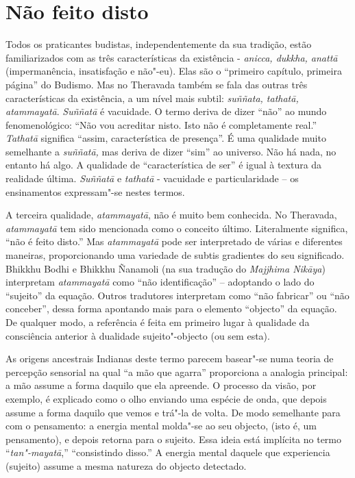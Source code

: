 \section{Não feito disto}

Todos os praticantes budistas, independentemente da sua tradição, estão
familiarizados com as três características da existência - \emph{anicca,
dukkha, anattā} (impermanência, insatisfação e não"-eu). Elas são o
``primeiro capítulo, primeira página'' do Budismo. Mas no Theravada
também se fala das outras três características da existência, a um nível
mais subtil: \emph{suññata, tathatā, atammayatā}. \emph{Suññatā} é
vacuidade. O termo deriva de dizer ``não'' ao mundo fenomenológico:
``Não vou acreditar nisto. Isto não é completamente
real.'' \emph{Tathatā} significa ``assim, característica de presença''.
É uma qualidade muito semelhante a \emph{suññatā,}  mas deriva de dizer
``sim'' ao universo. Não há nada, no entanto há algo. A qualidade de
``característica de ser'' é igual à textura da realidade última.
\emph{Suññatā} e \emph{tathatā} - vacuidade e particularidade  -- os
ensinamentos expressam"-se nestes termos.

A terceira qualidade,   \emph{atammayatā}, não é muito bem conhecida. No
Theravada,  \emph{atammayatā} tem sido mencionada como o conceito
último. Literalmente significa, ``não é feito disto.'' Mas
\emph{atammayatā} pode ser interpretado de várias e diferentes maneiras,
proporcionando uma variedade de subtis gradientes do seu significado.
Bhikkhu Bodhi e Bhikkhu Ñanamoli (na sua tradução do \emph{Majjhima
Nikāya}) interpretam \emph{atammayatā}  como ``não identificação'' --
 adoptando o lado do ``sujeito'' da equação. Outros tradutores
interpretam como ``não fabricar'' ou ``não conceber'', dessa forma
apontando mais para o elemento ``objecto'' da equação. De qualquer modo,
a referência é feita em primeiro lugar à qualidade da consciência
anterior à dualidade sujeito"-objecto (ou sem esta). 

As origens ancestrais Indianas deste termo parecem basear"-se numa teoria
de percepção sensorial na qual ``a mão que agarra'' proporciona a
analogia principal: a mão assume a forma daquilo que ela apreende. O
processo da visão, por exemplo, é explicado como o olho enviando uma
espécie de onda, que depois assume a forma daquilo que vemos e trá"-la de
volta. De modo semelhante para com o pensamento: a energia mental
molda"-se ao seu objecto, (isto é, um pensamento), e depois retorna para
o sujeito. Essa ideia está implícita no termo ``\emph{tan"-mayatā},''
``consistindo disso.'' A energia mental daquele que experiencia
(sujeito) assume a mesma natureza do objecto detectado.

